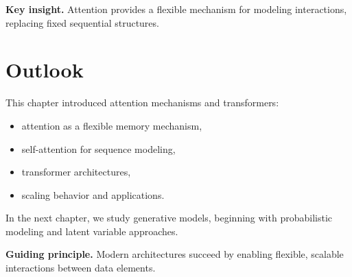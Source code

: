 \medskip

\noindent
\textbf{Key insight.}  
Attention provides a flexible mechanism for modeling interactions, replacing fixed sequential structures.

\section{Outlook}

This chapter introduced attention mechanisms and transformers:
\begin{itemize}
    \item attention as a flexible memory mechanism,
    \item self-attention for sequence modeling,
    \item transformer architectures,
    \item scaling behavior and applications.
\end{itemize}

\medskip

In the next chapter, we study generative models, beginning with probabilistic modeling and latent variable approaches.

\medskip

\noindent
\textbf{Guiding principle.}  
Modern architectures succeed by enabling flexible, scalable interactions between data elements.